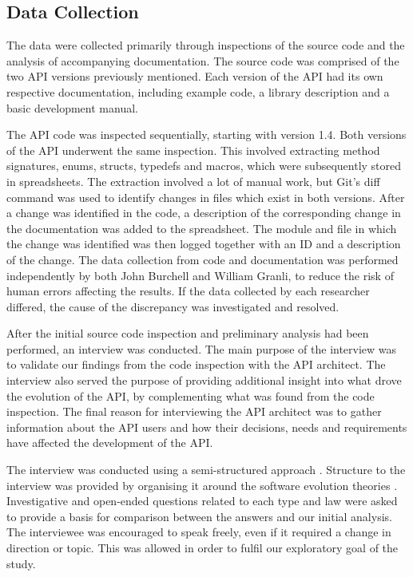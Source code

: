 \documentclass{sig-alternate}
\begin{document}
\subsection{Data Collection} \label{data_collection}  
The data were collected primarily through inspections of the source code and the analysis of accompanying documentation. The source code was comprised of the two API versions previously mentioned. Each version of the API had its own respective documentation, including example code, a library description and a basic development manual. 

The API code was inspected sequentially, starting with version 1.4. Both versions of the API underwent the same inspection. This involved extracting method signatures, enums, structs, typedefs and macros, which were subsequently stored in spreadsheets. The extraction involved a lot of manual work, but Git's \cite{git} diff command was used to identify changes in files which exist in both versions. After a change was identified in the code, a description of the corresponding change in the documentation was added to the spreadsheet. The module and file in which the change was identified was then logged together with an ID and a description of the change. The data collection from code and documentation was performed independently by both John Burchell and William Granli, to reduce the risk of human errors affecting the results. If the data collected by each researcher differed, the cause of the discrepancy was investigated and resolved. 

After the initial source code inspection and preliminary analysis had been performed, an interview was conducted. The main purpose of the interview was to validate our findings from the code inspection with the API architect. The interview also served the purpose of providing additional insight into what drove the evolution of the API, by complementing what was found from the code inspection. The final reason for interviewing the API architect was to gather information about the API users and how their decisions, needs and requirements have affected the development of the API. 

The interview was conducted using a semi-structured approach \cite{robson2002real}. Structure to the interview was provided by organising it around the software evolution theories \cite{chapin2001types, lehman90sview}. Investigative and open-ended questions related to each type and law were asked to provide a basis for comparison between the answers and our initial analysis. The interviewee was encouraged to speak freely, even if it required a change in direction or topic. This was allowed in order to fulfil our exploratory goal of the study. 
\end{document}
